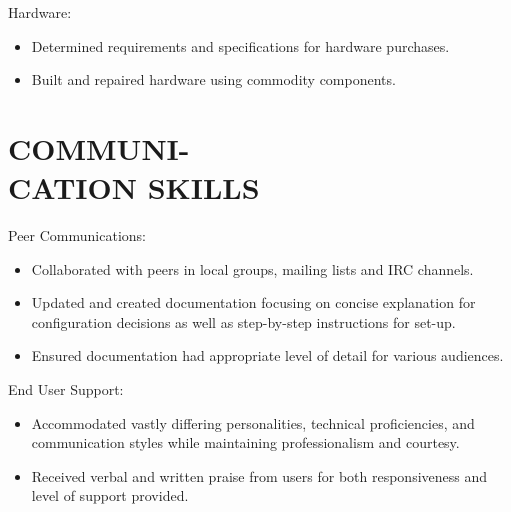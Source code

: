 \documentclass[line,margin]{res}
\begin{document}
\begin{resume}
    Hardware:
    \vspace{1 mm}
    \begin{itemize} \itemsep -1.5pt %
        \item Determined requirements and specifications for hardware purchases.
        \item Built and repaired hardware using commodity components.
    \end{itemize}


\section{COMMUNI- \\ CATION SKILLS}

    Peer Communications:
    \vspace{1 mm}
    \begin{itemize} \itemsep -1.5pt %
        \item Collaborated with peers in local groups, mailing lists and
        IRC channels.
        \item Updated and created documentation focusing on concise
        explanation for configuration decisions as well as step-by-step
        instructions for set-up.
        \item Ensured documentation had appropriate level of detail for
        various audiences.
    \end{itemize}
    \vspace{-3 mm}

    End User Support:
    \vspace{1 mm}
    \begin{itemize} \itemsep -1.5pt %
        \item Accommodated vastly differing personalities, technical
        proficiencies, and communication styles while maintaining
        professionalism and courtesy.
        \item Received verbal and written praise from users for both
        responsiveness and level of support provided.
    \end{itemize}








\end{resume}
\end{document}
